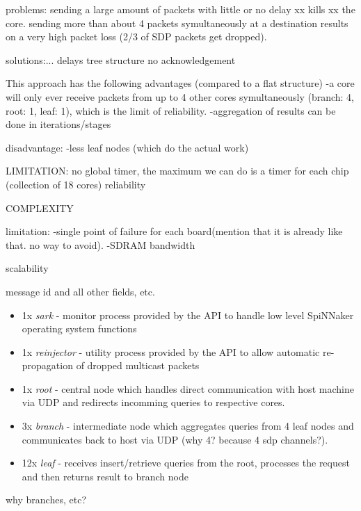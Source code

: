problems:
sending a large amount of packets with little or no delay xx kills xx the core. sending more than about 4 packets symultaneously at a destination results on a very high packet loss (2/3 of SDP packets get dropped).


solutions:...
delays
tree structure
no acknowledgement


This approach has the following advantages (compared to a flat structure)
-a core will only ever receive packets from up to 4 other cores symultaneously (branch: 4, root: 1, leaf: 1), which is the limit of reliability.
-aggregation of results can be done in iterations/stages

disadvantage:
-less leaf nodes (which do the actual work)

LIMITATION:
no global timer, the maximum we can do is a timer for each chip (collection of 18 cores)
reliability

COMPLEXITY

limitation:
-single point of failure for each board(mention that it is already like that. no way to avoid).
-SDRAM bandwidth

scalability

message id and all other fields, etc.

\begin{itemize}
\item 1x \textit{sark} - monitor process provided by the API to handle low level SpiNNaker operating system functions
\item 1x \textit{reinjector} - utility process provided by the API to allow automatic re-propagation of dropped multicast packets
\item 1x \textit{root} - central node which handles direct communication with host machine via UDP and redirects incomming queries to respective cores. 
\item 3x \textit{branch} - intermediate node which aggregates queries from 4 leaf nodes and communicates back to host via UDP (why 4? because 4 sdp channels?). 
\item 12x \textit{leaf} - receives insert/retrieve queries from the root, processes the request and then returns result to branch node
\end{itemize}
why branches, etc?

